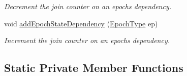 \begin{DoxyCompactItemize}
\begin{DoxyCompactList}\small\item\em Decrement the join counter on an epoch\textquotesingle{}s dependency. \end{DoxyCompactList}\item 
void \hyperlink{structvt_1_1term_1_1_termination_detector_ac0c59133b2db32f599aa4b5f8f451fe0}{add\+Epoch\+State\+Dependency} (\hyperlink{namespacevt_a985a5adf291c34a3ca263b3378388236}{Epoch\+Type} ep)
\begin{DoxyCompactList}\small\item\em Increment the join counter on an epoch\textquotesingle{}s dependency. \end{DoxyCompactList}\end{DoxyCompactItemize}
\subsection*{Static Private Member Functions}
